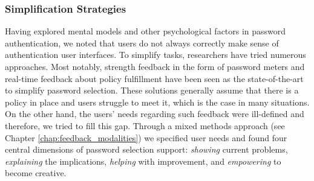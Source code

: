 \subsubsection{Simplification Strategies}
Having explored mental models and other psychological factors in password authentication, we noted that users do not always correctly make sense of authentication user interfaces. To simplify tasks, researchers have tried numerous approaches. Most notably, strength feedback in the form of password meters and real-time feedback about policy fulfillment have been seen as the state-of-the-art to simplify password selection. These solutions generally assume that there is a policy in place and users struggle to meet it, which is the case in many situations.
On the other hand, the users' needs regarding such feedback were ill-defined and therefore, we tried to fill this gap. Through a mixed methods approach (see Chapter \ref{chap:feedback_modalities}) we specified user needs and found four central dimensions of password selection support: \textit{showing} current problems, \textit{explaining} the implications, \textit{helping} with improvement, and \textit{empowering} to become creative. 

